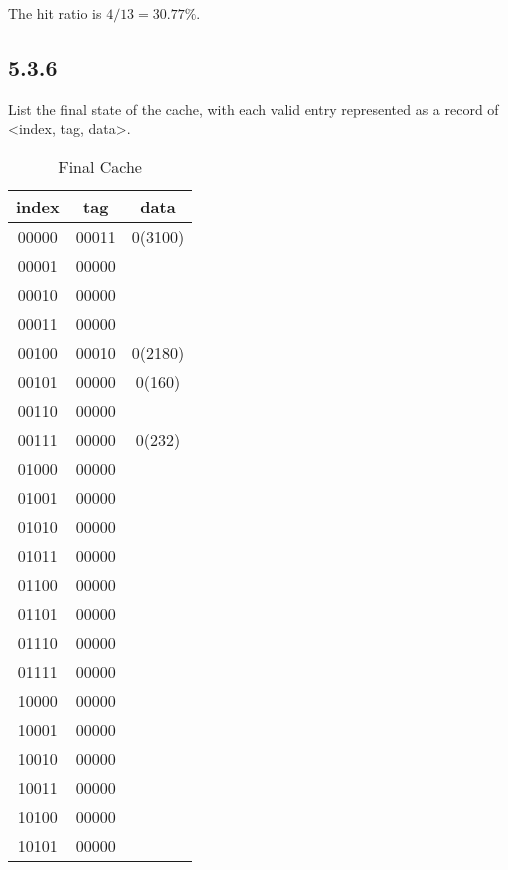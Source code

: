 \documentclass[paper=a4, fontsize=11pt]{scrartcl} %
\begin{document}
The hit ratio is $4/13=30.77\%$.


\subsection{5.3.6} %
\label{sub:5_3_6}
\begin{fancyquotes}
    List the final state of the cache, with each valid entry represented as a record of <index, tag, data>.
\end{fancyquotes}

\begin{table}[H]
    \caption{Final Cache}\label{tab:final_cache}
    \begin{center}
        \begin{tabular}{ccc}
        \toprule
        \textbf{index} & \textbf{tag} & \textbf{data} \\
        \midrule
        00000 & 00011 & 0(3100) \\
        00001 & 00000 & \\
        00010 & 00000 & \\
        00011 & 00000 & \\
        00100 & 00010 & 0(2180) \\
        00101 & 00000 & 0(160) \\
        00110 & 00000 & \\
        00111 & 00000 & 0(232) \\
        01000 & 00000 & \\
        01001 & 00000 & \\
        01010 & 00000 & \\
        01011 & 00000 & \\
        01100 & 00000 & \\
        01101 & 00000 & \\
        01110 & 00000 & \\
        01111 & 00000 & \\
        10000 & 00000 & \\
        10001 & 00000 & \\
        10010 & 00000 & \\
        10011 & 00000 & \\
        10100 & 00000 & \\
        10101 & 00000 & \\

\end{tabular}
\end{center}
\end{table}
\end{document}
